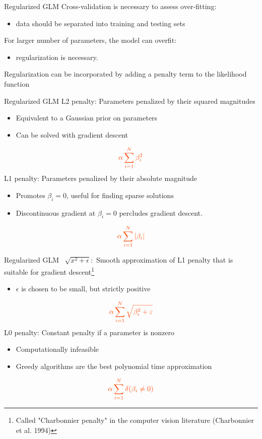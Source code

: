 \documentclass[svgnames,13pt,handout]{beamer}
\begin{document}
\begin{frame}{Regularized GLM }
Cross-validation is necessary to assess over-fitting: 
\begin{itemize}
	\item data should be separated into training and testing sets
	\end{itemize}
For larger number of parameters, the model can overfit:
\begin{itemize}
	\item regularization is necessary. 
	\end{itemize}
Regularization can be incorporated by adding a penalty term to the likelihood function
\end{frame} 

\begin{frame}{Regularized GLM }
L2 penalty: Parameters penalized by their squared magnitudes
\begin{itemize}
	\item Equivalent to a Gaussian prior on parameters
	\item Can be solved with gradient descent
	\end{itemize}
\[ {\color{emphasizecolor} \alpha \sum_{i=1}^N \beta_i^2 }\]
L1 penalty: Parameters penalized by their absolute magnitude
\begin{itemize}
	\item Promotes $\beta_i=0$, useful for finding sparse solutions
	\item Discontinuous gradient at $\beta_i=0$ percludes gradient descent. 
	\end{itemize}
\[ {\color{emphasizecolor} \alpha \sum_{i=1}^N |\beta_i| }\]
\end{frame} 

\begin{frame}{Regularized GLM }
~$\sqrt{x^2+\epsilon}:$ Smooth approximation of L1 penalty that is suitable for gradient descent\footnote{Called "Charbonnier penalty" in the computer vision literature (Charbonnier et al. 1994)}
\begin{itemize}
	\item $\epsilon$ is chosen to be small, but strictly positive
	\end{itemize}
\[ {\color{emphasizecolor} \alpha \sum_{i=1}^N \sqrt{\beta_i^2+\varepsilon} }\]
L0 penalty: Constant penalty if a parameter is nonzero
\begin{itemize}
	\item Computationally infeasible
	\item Greedy algorithms are the best polynomial time approximation
	\end{itemize}
\[ {\color{emphasizecolor} \alpha \sum_{i=1}^N \delta(\beta_i\ne 0) }\]
\end{frame} 
\end{document}
